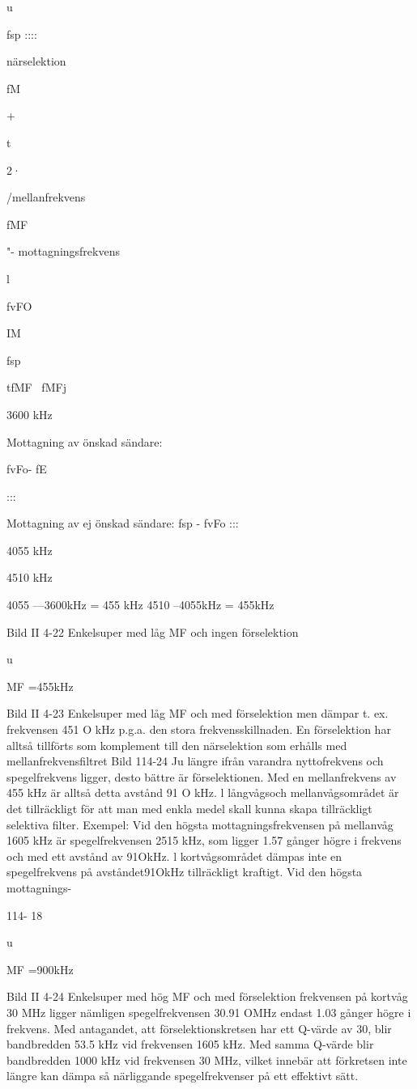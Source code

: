 u

fsp ::::

närselektion

fM

+

t

2·

/mellanfrekvens

fMF

"- mottagningsfrekvens

l

fvFO

IM

fsp

tfMF ~fMFj

3600
kHz

Mottagning av önskad sändare:

fvFo- fE

:::

Mottagning av ej önskad sändare: fsp - fvFo :::

4055
kHz

4510
kHz

4055 ---3600kHz = 455 kHz
4510 --4055kHz = 455kHz

Bild II 4-22 Enkelsuper med låg MF och ingen förselektion

u

MF =455kHz

Bild II 4-23 Enkelsuper med låg MF och med förselektion
men dämpar t. ex. frekvensen 451 O
kHz p.g.a. den stora frekvensskillnaden. En förselektion har alltså tillförts
som komplement till den närselektion
som erhålls med mellanfrekvensfiltret
Bild 114-24
Ju längre ifrån varandra nyttofrekvens och spegelfrekvens ligger,
desto bättre är förselektionen. Med en
mellanfrekvens av 455 kHz är alltså
detta avstånd 91 O kHz. l långvågsoch mellanvågsområdet är det tillräckligt för att man med enkla medel skall
kunna skapa tillräckligt selektiva filter.
Exempel:
Vid den högsta mottagningsfrekvensen på mellanvåg 1605 kHz är
spegelfrekvensen 2515 kHz, som ligger 1.57 gånger högre i frekvens och
med ett avstånd av 91OkHz. l kortvågsområdet dämpas inte en spegelfrekvens på avståndet91OkHz tillräckligt
kraftigt. Vid den högsta mottagnings-

114- 18

u

MF =900kHz

Bild II 4-24 Enkelsuper med hög MF och
med förselektion
frekvensen på kortvåg 30 MHz ligger nämligen
spegelfrekvensen 30.91 OMHz endast 1.03 gånger
högre i frekvens. Med antagandet, att förselektionskretsen har ett Q-värde av 30, blir bandbredden 53.5 kHz vid frekvensen 1605 kHz.
Med samma Q-värde blir bandbredden 1000
kHz vid frekvensen 30 MHz, vilket innebär att
förkretsen inte längre kan dämpa så närliggande
spegelfrekvenser på ett effektivt sätt.

